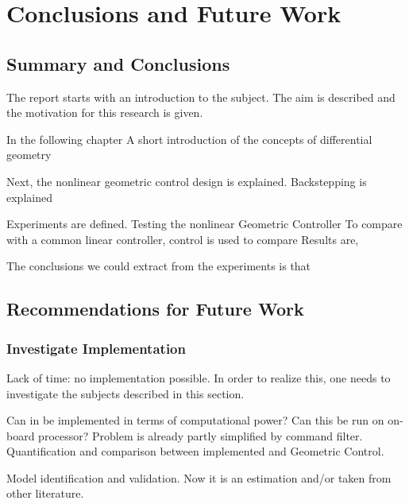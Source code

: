 \chapter{Conclusions and Future Work}\label{ch:conclusion}

\section{Summary and Conclusions}
The report starts with an introduction to the subject.
The aim is described and the motivation for this research is given.

In the following chapter
A short introduction of the concepts of differential geometry

Next, the nonlinear geometric control design is explained.
Backstepping is explained

Experiments are defined.
Testing the nonlinear Geometric Controller
To compare with a common linear controller,  control is used to compare
Results are,

The conclusions we could extract from the experiments is that

\section{Recommendations for Future Work}\label{ch:future}

\subsection{Investigate Implementation}
Lack of time: no implementation possible. In order to realize this, one needs to investigate the subjects described in this section.

Can in be implemented in terms of computational power? Can this be run on on-board processor?
Problem is already partly simplified by command filter. Quantification and comparison between implemented  and Geometric Control.

Model identification and validation. Now it is an estimation and/or taken from other literature.



